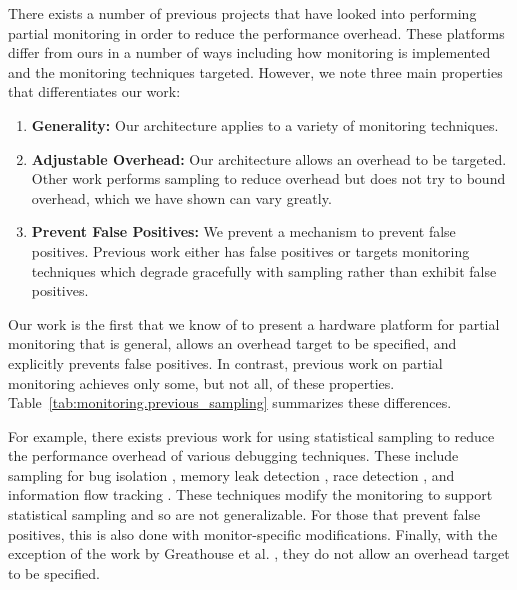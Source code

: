 There exists a number of previous projects that have looked into performing
partial monitoring in order to reduce the performance overhead. These
platforms differ from ours in a number of ways including how monitoring is
implemented and the monitoring techniques targeted. However, we note three main
properties that differentiates our work:
\begin{enumerate}
  \item \textbf{Generality:} Our architecture applies to a variety of monitoring techniques.
  \item \textbf{Adjustable Overhead:} Our architecture allows an overhead to be
  targeted. Other work performs sampling to reduce overhead but does not try
  to bound overhead, which we have shown can vary greatly.
  \item \textbf{Prevent False Positives:} We prevent a mechanism to prevent
  false positives. Previous work either has false positives or targets monitoring
  techniques which degrade gracefully with sampling rather than exhibit false
  positives.
\end{enumerate}
Our work is the first that we know of to present a hardware platform for partial
monitoring that is general, allows an overhead target to be specified, and
explicitly prevents false positives. In contrast, previous work on
partial monitoring achieves only some, but not all, of these properties.
Table~\ref{tab:monitoring.previous_sampling} summarizes these differences. 

For example, there exists previous work for using statistical sampling to
reduce the performance overhead of various debugging techniques. These include
sampling for bug isolation \cite{liblit-pldi05}, memory leak detection
\cite{chilimbi-asplos04}, race detection \cite{literace-pldi09, pacer-pldi10},
and information flow tracking \cite{testudo-micro08, greathouse-cgo11}. These
techniques modify the monitoring to support statistical sampling and so are not
generalizable. For those that prevent false positives, this is also done with
monitor-specific modifications. Finally, with the exception of the work by
Greathouse et al. \cite{greathouse-cgo11}, they do not allow an overhead target
to be specified.


